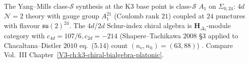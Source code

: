 \begin{remark}
\label{rem:yms-1}
The Yang--Mills class-$\mathcal S$ synthesis at the K3 base point is
class-$\mathcal S$ $A_1$ on $\Sigma_{0,24}$: $4d$ $\mathcal N=2$ theory
with gauge group $A_1^{21}$ (Coulomb rank $21$) coupled at $24$ punctures
with flavour $\mathfrak{su}(2)^{24}$. The $4d$/$2d$ Schur-index chiral
algebra is $\mathbf H_{\Delta_5}$-module category with
$c_{4d} = 107/6, c_{2d} = -214$ (Shapere--Tachikawa $2008$ \S 3
applied to Chacaltana--Distler $2010$ eq.~(5.14) count
$(n_v, n_h) = (63, 88)$)
\cite{Gaiotto2009,BeemRastelli2015,ChacaltanaDistler2010}.
Compare Vol.~III Chapter~\ref{V3-ch:k3-chiral-bialgebra-platonic}.
\end{remark}
